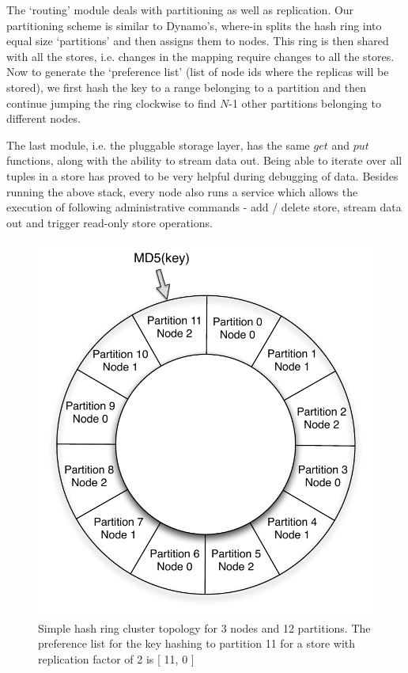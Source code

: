 The `routing' module deals with partitioning as well as replication. Our partitioning scheme is similar to Dynamo's, where-in \projectname{} splits the hash ring into equal size `partitions' and then assigns them to nodes. This ring is then shared with all the stores, i.e. changes in the mapping require changes to all the stores. Now to generate the `preference list' (list of node ids where the replicas will be stored), we first hash the key to a range belonging to a partition and then continue jumping the ring clockwise to find $N$-1 other partitions belonging to different nodes. 

The last module, i.e. the pluggable storage layer, has the same $get$ and $put$ functions, along with the ability to stream data out. Being able to iterate over all tuples in a store has proved to be very helpful during debugging of data. Besides running the above stack, every node also runs a service which allows the execution of following administrative commands - add / delete store, stream data out and trigger read-only store operations. 

\begin{figure}
  \centering
    \includegraphics[scale=0.40]{images/hash.pdf}
  \caption{Simple hash ring cluster topology for 3 nodes and 12 partitions. The preference list for the key hashing to partition 11 for a store with replication factor of 2 is [ 11, 0 ]}
  \label{hash}
\end{figure}

